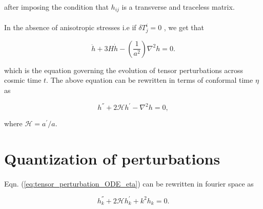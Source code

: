 \documentclass[12pt,a4paper,oneside]{book}
\begin{document}
\noindent after imposing the condition that $h_{ij}$ is a transverse and traceless matrix. 





\paragraph*{} In the absence of anisotropic stresses i.e if $\delta T^i_j = 0$
, we get that

\begin{equation}\label{eq:tensor_perturbation_ODE}
\ddot{h} + 3H\dot{h} - \left(\frac{1}{a^2}\right)\nabla ^2h = 0.
\end{equation}

\noindent which is the equation governing the evolution of tensor 
perturbations across cosmic time $t$. The above equation 
can be rewritten in terms of conformal time $\eta$ as 

\begin{equation}\label{eq:tensor_perturbation_ODE_eta}
{h}^{''} + 2{\mathcal{H}}{h}^{'} - \nabla ^2h = 0,
\end{equation}

\noindent where ${\mathcal{H}} = a^{'}/a$.

\section{Quantization of perturbations}

\paragraph*{} Eqn. (\ref{eq:tensor_perturbation_ODE_eta}) can be 
rewritten in fourier space as 

\begin{equation}\label{eq:tensor_perturbation_eqn_fourier}
h_k^{''} + 2{\mathcal{H}}h_k^{'} + k^2	h_k = 0.
\end{equation}
\end{document}
